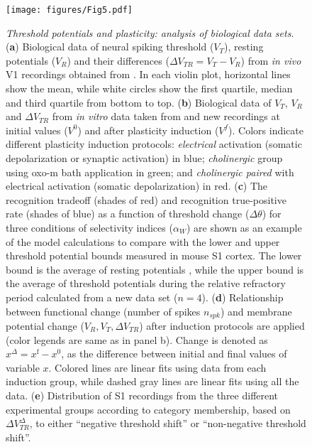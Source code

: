 \begin{figure}[H]
    \centering
    \texttt{[image: figures/Fig5.pdf]}
    \caption{
    \textit{Threshold potentials and plasticity: analysis of biological data sets}.
    (\textbf{a}) Biological data of
            neural spiking threshold ($V_T$),
            resting potentials ($V_R$)
            and their differences  ($\Delta V_{TR} = V_T - V_R$)
        from \textit{in vivo} V1 recordings
            obtained from \cite{Li2020-ej}.
        In each violin plot,
            horizontal lines show the mean,
            while white circles show
                the first quartile, median and third quartile from bottom to top.
    (\textbf{b}) Biological data of $V_T$, $V_R$ and $\Delta V_{TR}$
        from \textit{in vitro} data taken from \cite{Gill2020-wy} and new recordings
        at initial values ($V^0$)
        and after plasticity induction ($V^f$).
        Colors indicate different plasticity induction protocols:
            \textit{electrical} activation (somatic depolarization or synaptic activation) in blue;
            \textit{cholinergic} group using oxo-m bath application in green;
            and \textit{cholinergic paired} with electrical activation (somatic depolarization) in red.
    (\textbf{c}) The recognition tradeoff (shades of red)
            and recognition true-positive rate (shades of blue)
            as a function of threshold change ($\Delta\theta$)
            for three conditions of selectivity indices ($\alpha_W$)
        are shown as an example of the model calculations
            to compare with the lower and upper threshold potential bounds measured in mouse S1 cortex.
        The lower bound is the average of resting potentials
            ,
            while the upper bound is the average of threshold potentials
                during the relative refractory period calculated from a new data set ($n = 4$).
    (\textbf{d}) Relationship between functional change (number of spikes $n_{spk}$)
            and membrane potential change ($V_R, V_T, \Delta V_{TR}$)
            after induction protocols are applied (color legends are same as in panel b).
        Change is denoted as
            $x^{\Delta} = x^{\mathrm{f}} - x^{\mathrm{0}}$,
            as the difference between initial and final values of variable $x$.
        Colored lines are linear fits using data from each induction group,
            while dashed gray lines are linear fits using all the data.
    (\textbf{e})
    Distribution of S1 recordings
        from the three different experimental groups
        according to category membership,
        based on $\Delta V_{TR}^{\Delta}$,
        to either
        ``negative threshold shift''
        or ``non-negative threshold shift''.
    }
    \label{fig:ffwd-biol-data}
\end{figure}

